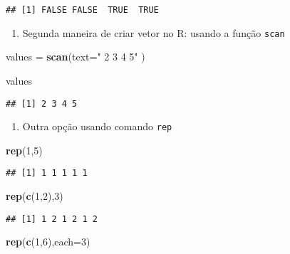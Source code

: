 \documentclass[]{article}
\newenvironment{Shaded}{\begin{snugshade}}{\end{snugshade}}
\newcommand{\KeywordTok}[1]{\textcolor[rgb]{0.13,0.29,0.53}{\textbf{#1}}}
\newcommand{\DataTypeTok}[1]{\textcolor[rgb]{0.13,0.29,0.53}{#1}}
\newcommand{\DecValTok}[1]{\textcolor[rgb]{0.00,0.00,0.81}{#1}}
\newcommand{\StringTok}[1]{\textcolor[rgb]{0.31,0.60,0.02}{#1}}
\newcommand{\NormalTok}[1]{#1}
\providecommand{\tightlist}{%
  \setlength{\itemsep}{0pt}\setlength{\parskip}{0pt}}
\begin{document}
\begin{verbatim}
## [1] FALSE FALSE  TRUE  TRUE
\end{verbatim}

\begin{enumerate}
\def\labelenumi{\arabic{enumi}.}
\setcounter{enumi}{1}
\tightlist
\item
  Segunda maneira de criar vetor no R: usando a função \texttt{scan}
\end{enumerate}

\begin{Shaded}
\begin{Highlighting}[]
\NormalTok{values =}\StringTok{ }\KeywordTok{scan}\NormalTok{(}\DataTypeTok{text=}\StringTok{"}
\StringTok{2}
\StringTok{3}
\StringTok{4}
\StringTok{5"}
\NormalTok{)}

\NormalTok{values}
\end{Highlighting}
\end{Shaded}

\begin{verbatim}
## [1] 2 3 4 5
\end{verbatim}

\begin{enumerate}
\def\labelenumi{\arabic{enumi}.}
\setcounter{enumi}{2}
\tightlist
\item
  Outra opção usando comando \texttt{rep}
\end{enumerate}

\begin{Shaded}
\begin{Highlighting}[]
\KeywordTok{rep}\NormalTok{(}\DecValTok{1}\NormalTok{,}\DecValTok{5}\NormalTok{)}
\end{Highlighting}
\end{Shaded}

\begin{verbatim}
## [1] 1 1 1 1 1
\end{verbatim}

\begin{Shaded}
\begin{Highlighting}[]
\KeywordTok{rep}\NormalTok{(}\KeywordTok{c}\NormalTok{(}\DecValTok{1}\NormalTok{,}\DecValTok{2}\NormalTok{),}\DecValTok{3}\NormalTok{)}
\end{Highlighting}
\end{Shaded}

\begin{verbatim}
## [1] 1 2 1 2 1 2
\end{verbatim}

\begin{Shaded}
\begin{Highlighting}[]
\KeywordTok{rep}\NormalTok{(}\KeywordTok{c}\NormalTok{(}\DecValTok{1}\NormalTok{,}\DecValTok{6}\NormalTok{),}\DataTypeTok{each=}\DecValTok{3}\NormalTok{)}
\end{Highlighting}
\end{Shaded}
\end{document}
